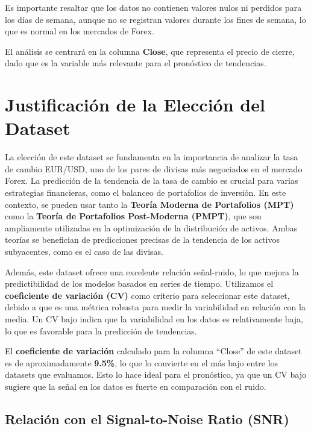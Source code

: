 \documentclass[
]{book}
\begin{document}
Es importante resaltar que los datos no contienen valores nulos ni perdidos para los días de semana, aunque no se registran valores durante los fines de semana, lo que es normal en los mercados de Forex.

El análisis se centrará en la columna \textbf{Close}, que representa el precio de cierre, dado que es la variable más relevante para el pronóstico de tendencias.

\section{Justificación de la Elección del Dataset}\label{justificaciuxf3n-de-la-elecciuxf3n-del-dataset}

La elección de este dataset se fundamenta en la importancia de analizar la tasa de cambio EUR/USD, uno de los pares de divisas más negociados en el mercado Forex. La predicción de la tendencia de la tasa de cambio es crucial para varias estrategias financieras, como el balanceo de portafolios de inversión. En este contexto, se pueden usar tanto la \textbf{Teoría Moderna de Portafolios (MPT)} como la \textbf{Teoría de Portafolios Post-Moderna (PMPT)}, que son ampliamente utilizadas en la optimización de la distribución de activos. Ambas teorías se benefician de predicciones precisas de la tendencia de los activos subyacentes, como es el caso de las divisas.

Además, este dataset ofrece una excelente relación señal-ruido, lo que mejora la predictibilidad de los modelos basados en series de tiempo. Utilizamos el \textbf{coeficiente de variación (CV)} como criterio para seleccionar este dataset, debido a que es una métrica robusta para medir la variabilidad en relación con la media. Un CV bajo indica que la variabilidad en los datos es relativamente baja, lo que es favorable para la predicción de tendencias.

El \textbf{coeficiente de variación} calculado para la columna ``Close'' de este dataset es de aproximadamente \textbf{9.5\%}, lo que lo convierte en el más bajo entre los datasets que evaluamos. Esto lo hace ideal para el pronóstico, ya que un CV bajo sugiere que la señal en los datos es fuerte en comparación con el ruido.

\subsection{Relación con el Signal-to-Noise Ratio (SNR)}\label{relaciuxf3n-con-el-signal-to-noise-ratio-snr}
\end{document}
